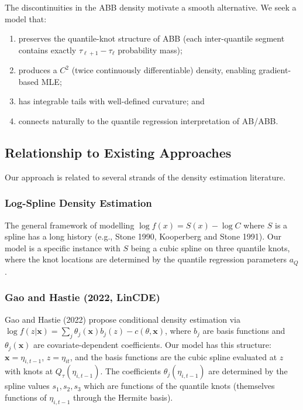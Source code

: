 \documentclass[12pt]{article}
\begin{document}
The discontinuities in the ABB density motivate a smooth alternative.
We seek a model that:
\begin{enumerate}
\item preserves the quantile-knot structure of ABB (each inter-quantile
  segment contains exactly $\tau_{\ell+1} - \tau_\ell$ probability mass);
\item produces a $C^2$ (twice continuously differentiable) density,
  enabling gradient-based MLE;
\item has integrable tails with well-defined curvature; and
\item connects naturally to the quantile regression interpretation of AB/ABB.
\end{enumerate}

\subsection{Relationship to Existing Approaches}

Our approach is related to several strands of the density estimation literature.

\subsubsection*{Log-Spline Density Estimation}

The general framework of modelling $\log f(x) = S(x) - \log C$ where $S$ is
a spline has a long history (e.g., Stone 1990, Kooperberg and Stone 1991).
Our model is a specific instance with $S$ being a cubic spline on three
quantile knots, where the knot locations are determined by the quantile
regression parameters $a_Q$.

\subsubsection*{Gao and Hastie (2022, LinCDE)}

Gao and Hastie (2022) propose conditional density estimation via
$\log f(z|\mathbf{x}) = \sum_j \theta_j(\mathbf{x}) b_j(z) - c(\theta, \mathbf{x})$,
where $b_j$ are basis functions and $\theta_j(\mathbf{x})$ are
covariate-dependent coefficients.
Our model has this structure: $\mathbf{x} = \eta_{i,t-1}$,
$z = \eta_{it}$, and the basis functions are the cubic spline evaluated at
$z$ with knots at $Q_\tau(\eta_{i,t-1})$.
The coefficients $\theta_j(\eta_{i,t-1})$ are determined by the spline
values $s_1, s_2, s_3$ which are functions of the quantile knots
(themselves functions of $\eta_{i,t-1}$ through the Hermite basis).
\end{document}
